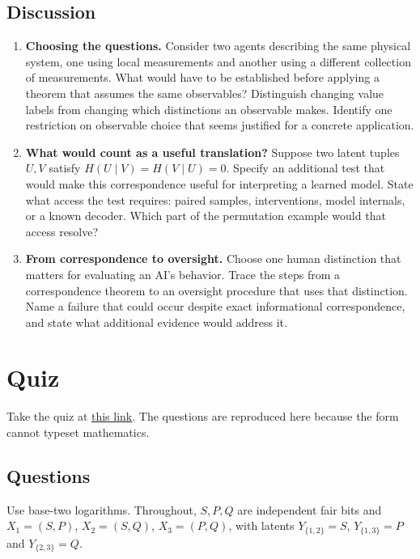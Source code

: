 \documentclass[11pt]{article}
\begin{document}
\subsection{Discussion}
\begin{enumerate}
\item \textbf{Choosing the questions.} Consider two agents describing the same
physical system, one using local measurements and another using a different
collection of measurements. What would have to be established before applying
a theorem that assumes the same observables? Distinguish changing value labels
from changing which distinctions an observable makes. Identify one restriction
on observable choice that seems justified for a concrete application.
\item \textbf{What would count as a useful translation?} Suppose two latent tuples $U,V$
satisfy $H(U\mid V)=H(V\mid U)=0$. Specify an additional test
that would make this correspondence useful for interpreting a learned model.
State what access the test requires: paired samples, interventions, model
internals, or a known decoder. Which part of the permutation example would
that access resolve?
\item \textbf{From correspondence to oversight.} Choose one human distinction
that matters for evaluating an AI's behavior. Trace the steps from a
correspondence theorem to an oversight procedure that uses that distinction.
Name a failure that could occur despite exact informational correspondence,
and state what additional evidence would address it.
\end{enumerate}

\section{Quiz}
Take the quiz at
\href{https://docs.google.com/forms/d/e/1FAIpQLSdTAs3Dq6dOeoju0TsyfaVcEcRdZaNgpAe_FMC7rCR3fohOSw/viewform}{this
link}. The questions are reproduced here because the form cannot typeset
mathematics.

\subsection{Questions}
Use base-two logarithms. Throughout, $S,P,Q$ are independent fair bits and
$X_1=(S,P)$, $X_2=(S,Q)$, $X_3=(P,Q)$, with latents $Y_{\{1,2\}}=S$,
$Y_{\{1,3\}}=P$ and $Y_{\{2,3\}}=Q$.
\end{document}
